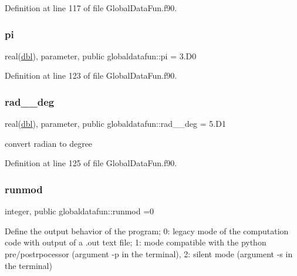 Definition at line 117 of file Global\+Data\+Fun.\+f90.

\mbox{\label{namespaceglobaldatafun_a05144a47841796a672385a1db57f91a1}} 
\subsubsection{\texorpdfstring{pi}{pi}}
{\footnotesize\ttfamily real(\hyperlink{namespaceglobaldatafun_a5008801201dd34f2af8eae07756befb4}{dbl}), parameter, public globaldatafun\+::pi = 3.\+D0}



Definition at line 123 of file Global\+Data\+Fun.\+f90.

\mbox{\label{namespaceglobaldatafun_a65560765d885097ca1432983f9cf6bab}} 
\subsubsection{\texorpdfstring{rad\+\_\+\_\+deg}{rad\_2\_deg}}
{\footnotesize\ttfamily real(\hyperlink{namespaceglobaldatafun_a5008801201dd34f2af8eae07756befb4}{dbl}), parameter, public globaldatafun\+::rad\+\_\+\_\+deg = 5.\+D1}



convert radian to degree 



Definition at line 125 of file Global\+Data\+Fun.\+f90.

\mbox{\label{namespaceglobaldatafun_a69fb7d8f3bbcc95ea17d1f924b50fbfa}} 
\subsubsection{\texorpdfstring{runmod}{runmod}}
{\footnotesize\ttfamily integer, public globaldatafun\+::runmod =0}



Define the output behavior of the program; 0\+: legacy mode of the computation code with output of a .out text file; 1\+: mode compatible with the python pre/postrpocessor (argument -\/p in the terminal), 2\+: silent mode (argument -\/s in the terminal) 



